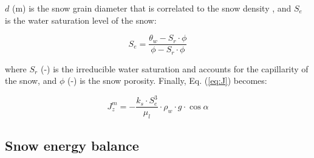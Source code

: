 \noindent $d$ (m) is the snow grain diameter that is correlated to the snow density  \citep{SNTHERM}, and $S_e$ is the water saturation level of the snow:

\begin{equation}
S_e=\frac{\theta_w-S_r \cdot \phi}{\phi - S_r \cdot \phi}
\end{equation}

\noindent where $S_r$ (-) is the irreducible water saturation \citep{Colbeck72} and accounts for the capillarity of the snow, and $\phi$ (-) is the snow porosity.
Finally, Eq. (\ref{eq:J}) becomes:

\begin{equation} \label{}
J_z^m =-\frac{k_{s} \cdot S_e^3}{\mu_l} \cdot \rho_w \cdot g \cdot \cos \alpha
\end{equation}




\subsection{Snow energy balance}

